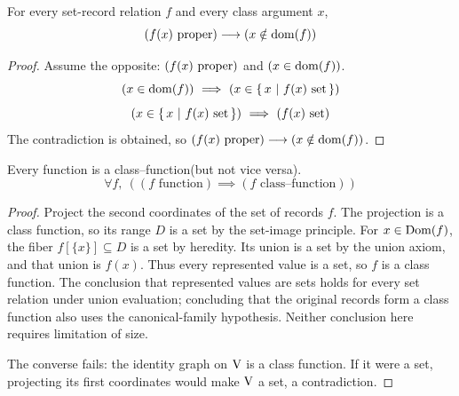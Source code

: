 \begin{lemma}
For every set-record relation $f$ and every class argument $x$,
\[
(f(x){\text{ proper}})
\longrightarrow
(x\notin\mathrm{dom}(f))
\label{lem:proper value not from dom}
\]
\end{lemma}
\begin{proof}
Assume the opposite: $(f(x){\text{ proper}})$ and $(x\in\mathrm{dom}(f))$.
\[
(x\in\mathrm{dom}(f))
\ \Longrightarrow\ 
(x\in\left\{\,x\ \middle|\ f(x)\mathrm{\ set}\,\right\})
\]
\[
(x\in\left\{\,x\ \middle|\ f(x)\mathrm{\ set}\,\right\})
\ \Longrightarrow\ 
(f(x)\mathrm{\ set})
\]
The contradiction is obtained, so $(f(x){\text{ proper}})\longrightarrow(x\notin\mathrm{dom}(f))$.
\end{proof}
\begin{theorem}
Every function is a class--function(but not vice versa).
\[
\forall f,\ ((f\text{ function})\implies(f\text{ class--function}))
\]
\end{theorem}
\begin{proof}
Project the second coordinates of the set of records $f$. The projection
is a class function, so its range $D$ is a set by the set-image principle.
For $x\in\mathrm{Dom}(f)$, the fiber $f[\{x\}]\subseteq D$ is a set by heredity.
Its union is a set by the union axiom, and that union is $f(x)$.
Thus every represented value is a set, so $f$ is a class function.
The conclusion that represented values are sets holds for every set
relation under union evaluation; concluding that the original records
form a class function also uses the canonical-family hypothesis.
Neither conclusion here requires limitation of size.

The converse fails: the identity graph on $\mathrm{V}$ is a class function.
If it were a set, projecting its first coordinates would make $\mathrm{V}$ a
set, a contradiction.
\end{proof}

